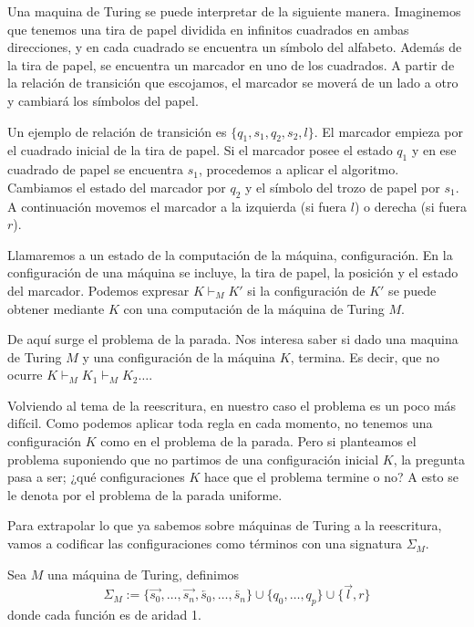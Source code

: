 Una maquina de Turing se puede interpretar de la siguiente
manera. Imaginemos que tenemos una tira de papel dividida en infinitos
cuadrados en ambas direcciones, y en cada cuadrado se encuentra un símbolo del
alfabeto. Además de la tira de papel, se encuentra un marcador en uno
de los cuadrados. A partir de la relación de transición que escojamos,
el marcador se moverá de un lado a otro y cambiará los símbolos del
papel. 

Un ejemplo de relación de transición es $\{ q_1, s_1, q_2, s_2, l
\}$. El marcador empieza por el cuadrado inicial de la tira de
papel. Si el marcador posee el estado $q_1$ y en ese cuadrado de
papel se encuentra $s_1$, procedemos a aplicar el algoritmo. Cambiamos
el estado del marcador por $q_2$ y el símbolo del trozo de papel por
$s_1$. A continuación movemos el marcador a la izquierda (si fuera
$l$) o derecha (si fuera $r$).


Llamaremos a un estado de la computación de la máquina,
configuración. En la configuración de una máquina se incluye, la tira
de papel, la posición y el estado del marcador. Podemos expresar
$K \vdash_M K'$ si la configuración de $K'$ se puede obtener mediante
$K$ con una computación de la máquina de Turing $M$.

De aquí surge el problema de la parada. Nos interesa saber si dado una
maquina de Turing $M$ y una configuración de la máquina $K$,
termina. Es decir, que no ocurre $K \vdash_M K_1 \vdash_M K_2 \dots$.

Volviendo al tema de la reescritura, en nuestro caso el problema es
un poco más difícil. Como podemos aplicar toda regla en cada momento,
no tenemos una configuración $K$ como en el problema de la
parada. Pero si planteamos el problema suponiendo que no partimos de
una configuración inicial $K$, la pregunta pasa a ser; ¿qué
configuraciones $K$ hace que el problema termine o no? A esto se le
denota por el problema de la parada uniforme. 

Para extrapolar lo que ya sabemos sobre máquinas de Turing a la
reescritura, vamos a codificar las configuraciones como términos con
una signatura $\Sigma_M$.

\begin{defi}
Sea $M$ una máquina de Turing, definimos 
\[
  \Sigma_M := \{ \overrightarrow{s_0}, \dots, \overrightarrow{s_n},
  \overleftarrow{s_0}, \dots, \overleftarrow{s_n} \} \cup \{q_0,
  \dots, q_p \} \cup \{\overrightarrow{l}, r \}
\]
donde cada función es de aridad 1.
\end{defi}

